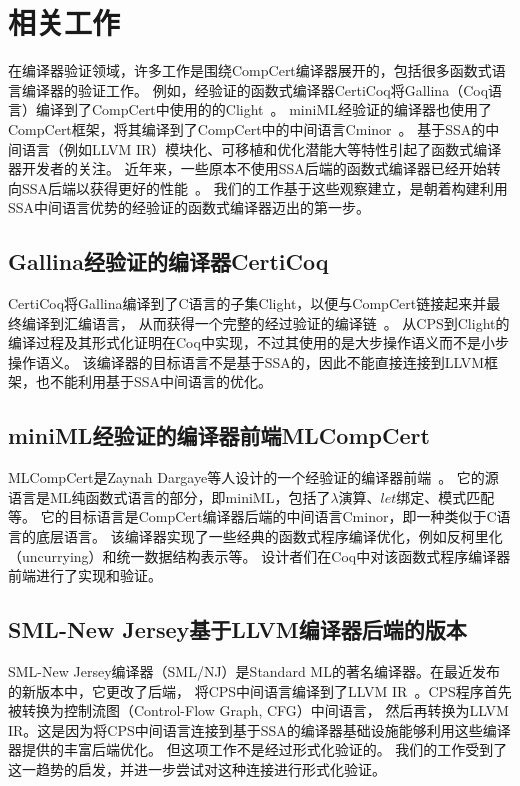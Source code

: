 
\chapter{相关工作} \label{ch:related}

在编译器验证领域，许多工作是围绕CompCert编译器展开的，包括很多函数式语言编译器的验证工作。
例如，经验证的函数式编译器CertiCoq将Gallina（Coq语言）编译到了CompCert中使用的的Clight~\cite{belanger2019certified}。
miniML经验证的编译器也使用了CompCert框架，将其编译到了CompCert中的中间语言Cminor~\cite{dargaye2009verification}。
基于SSA的中间语言（例如LLVM IR）模块化、可移植和优化潜能大等特性引起了函数式编译器开发者的关注。
近年来，一些原本不使用SSA后端的函数式编译器已经开始转向SSA后端以获得更好的性能~\cite{farvardin2020new}。
我们的工作基于这些观察建立，是朝着构建利用SSA中间语言优势的经验证的函数式编译器迈出的第一步。

\section{Gallina经验证的编译器CertiCoq}

CertiCoq将Gallina编译到了C语言的子集Clight，以便与CompCert链接起来并最终编译到汇编语言，
从而获得一个完整的经过验证的编译链~\cite{belanger2019certified,zoe-oopsla2021,zoe-icfp2021}。
从CPS到Clight的编译过程及其形式化证明在Coq中实现，不过其使用的是大步操作语义而不是小步操作语义。
该编译器的目标语言不是基于SSA的，因此不能直接连接到LLVM框架，也不能利用基于SSA中间语言的优化。

\section{miniML经验证的编译器前端MLCompCert}

MLCompCert是Zaynah Dargaye等人设计的一个经验证的编译器前端~\cite{dargaye2009verification}。
它的源语言是ML纯函数式语言的部分，即miniML，包括了$\lambda$演算、$let$绑定、模式匹配等。
它的目标语言是CompCert编译器后端的中间语言Cminor，即一种类似于C语言的底层语言。
该编译器实现了一些经典的函数式程序编译优化，例如反柯里化（uncurrying）和统一数据结构表示等。
设计者们在Coq中对该函数式程序编译器前端进行了实现和验证。

\section{SML-New Jersey基于LLVM编译器后端的版本}

SML-New Jersey编译器（SML/NJ）是Standard ML的著名编译器。在最近发布的新版本中，它更改了后端，
将CPS中间语言编译到了LLVM IR~\cite{farvardin2020new}。CPS程序首先被转换为控制流图（Control-Flow Graph, CFG）中间语言，
然后再转换为LLVM IR。这是因为将CPS中间语言连接到基于SSA的编译器基础设施能够利用这些编译器提供的丰富后端优化。
但这项工作不是经过形式化验证的。
我们的工作受到了这一趋势的启发，并进一步尝试对这种连接进行形式化验证。

